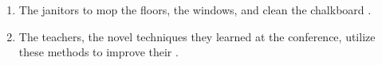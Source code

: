 \begin{spacing}{1.5}
\begin{enumerate}
\item \begin{inparaenum}[A]
The janitors   to mop the floors,  the windows, and clean the chalkboard . 
\end{inparaenum}

\item \begin{inparaenum}[A]
The teachers,  the novel  techniques they learned at the conference,  utilize these methods to improve their .  
\end{inparaenum}
\end{enumerate}
\end{spacing}